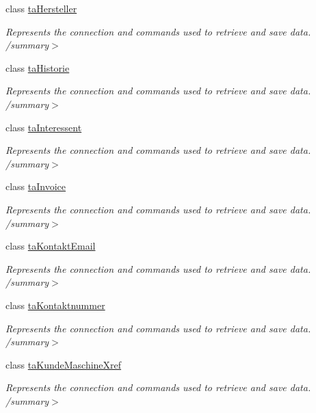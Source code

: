 \begin{DoxyCompactItemize}
class \hyperlink{class_products_1_1_data_1_1ds_sage_table_adapters_1_1ta_hersteller}{ta\+Hersteller}
\begin{DoxyCompactList}\small\item\em Represents the connection and commands used to retrieve and save data. /summary$>$ \end{DoxyCompactList}\item 
class \hyperlink{class_products_1_1_data_1_1ds_sage_table_adapters_1_1ta_historie}{ta\+Historie}
\begin{DoxyCompactList}\small\item\em Represents the connection and commands used to retrieve and save data. /summary$>$ \end{DoxyCompactList}\item 
class \hyperlink{class_products_1_1_data_1_1ds_sage_table_adapters_1_1ta_interessent}{ta\+Interessent}
\begin{DoxyCompactList}\small\item\em Represents the connection and commands used to retrieve and save data. /summary$>$ \end{DoxyCompactList}\item 
class \hyperlink{class_products_1_1_data_1_1ds_sage_table_adapters_1_1ta_invoice}{ta\+Invoice}
\begin{DoxyCompactList}\small\item\em Represents the connection and commands used to retrieve and save data. /summary$>$ \end{DoxyCompactList}\item 
class \hyperlink{class_products_1_1_data_1_1ds_sage_table_adapters_1_1ta_kontakt_email}{ta\+Kontakt\+Email}
\begin{DoxyCompactList}\small\item\em Represents the connection and commands used to retrieve and save data. /summary$>$ \end{DoxyCompactList}\item 
class \hyperlink{class_products_1_1_data_1_1ds_sage_table_adapters_1_1ta_kontaktnummer}{ta\+Kontaktnummer}
\begin{DoxyCompactList}\small\item\em Represents the connection and commands used to retrieve and save data. /summary$>$ \end{DoxyCompactList}\item 
class \hyperlink{class_products_1_1_data_1_1ds_sage_table_adapters_1_1ta_kunde_maschine_xref}{ta\+Kunde\+Maschine\+Xref}
\begin{DoxyCompactList}\small\item\em Represents the connection and commands used to retrieve and save data. /summary$>$ \end{DoxyCompactList}\item 

\end{DoxyCompactItemize}
